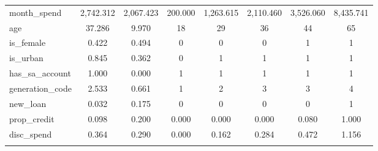\begin{table}[!htbp]
\begin{tabular}{@{\extracolsep{5pt}}lccccccc}
month\_spend & 2,742.312 & 2,067.423 & 200.000 & 1,263.615 & 2,110.460 & 3,526.060 & 8,435.741 \\ 
age & 37.286 & 9.970 & 18 & 29 & 36 & 44 & 65 \\ 
is\_female & 0.422 & 0.494 & 0 & 0 & 0 & 1 & 1 \\ 
is\_urban & 0.845 & 0.362 & 0 & 1 & 1 & 1 & 1 \\ 
has\_sa\_account & 1.000 & 0.000 & 1 & 1 & 1 & 1 & 1 \\ 
generation\_code & 2.533 & 0.661 & 1 & 2 & 3 & 3 & 4 \\ 
new\_loan & 0.032 & 0.175 & 0 & 0 & 0 & 0 & 1 \\ 
prop\_credit & 0.098 & 0.200 & 0.000 & 0.000 & 0.000 & 0.080 & 1.000 \\ 
disc\_spend & 0.364 & 0.290 & 0.000 & 0.162 & 0.284 & 0.472 & 1.156 \\ 
\hline \\[-1.8ex] 
\end{tabular} 
\end{table} 
